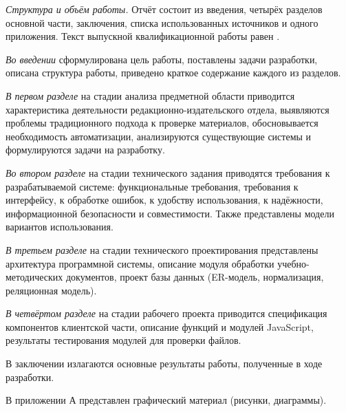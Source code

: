\textit{Структура и объём работы.} Отчёт состоит из введения, четырёх разделов основной части, заключения, списка использованных источников и одного приложения. Текст выпускной квалификационной работы равен .

\textit{Во введении} сформулирована цель работы, поставлены задачи разработки, описана структура работы, приведено краткое содержание каждого из разделов.

\textit{В первом разделе} на стадии анализа предметной области приводится характеристика деятельности редакционно-издательского отдела, выявляются проблемы традиционного подхода к проверке материалов, обосновывается необходимость автоматизации, анализируются существующие системы и формулируются задачи на разработку.

\textit{Во втором разделе} на стадии технического задания приводятся требования к разрабатываемой системе: функциональные требования, требования к интерфейсу, к обработке ошибок, к удобству использования, к надёжности, информационной безопасности и совместимости. Также представлены модели вариантов использования.

\textit{В третьем разделе} на стадии технического проектирования представлены архитектура программной системы, описание модуля обработки учебно-методических документов, проект базы данных (ER-модель, нормализация, реляционная модель).

\textit{В четвёртом разделе} на стадии рабочего проекта приводится спецификация компонентов клиентской части, описание функций и модулей JavaScript, результаты тестирования модулей для проверки файлов.

В заключении излагаются основные результаты работы, полученные в ходе разработки.

В приложении А представлен графический материал (рисунки, диаграммы).